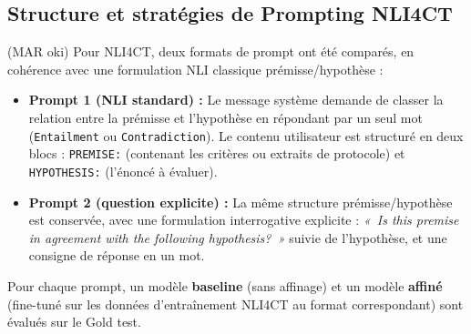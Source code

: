 \subsection{Structure et stratégies de Prompting NLI4CT} (MAR oki)
Pour NLI4CT, deux formats de prompt ont été comparés, en cohérence avec une formulation NLI classique prémisse/hypothèse :
\begin{itemize}
    \item \textbf{Prompt 1 (NLI standard) :} Le message système demande de classer la relation entre la prémisse et l'hypothèse en répondant par un seul mot (\texttt{Entailment} ou \texttt{Contradiction}). Le contenu utilisateur est structuré en deux blocs : \texttt{PREMISE:} (contenant les critères ou extraits de protocole) et \texttt{HYPOTHESIS:} (l'énoncé à évaluer).
    \item \textbf{Prompt 2 (question explicite) :} La même structure prémisse/hypothèse est conservée, avec une formulation interrogative explicite : \textit{«~Is this premise in agreement with the following hypothesis?~»} suivie de l'hypothèse, et une consigne de réponse en un mot.
\end{itemize}
Pour chaque prompt, un modèle \textbf{baseline} (sans affinage) et un modèle \textbf{affiné} (fine-tuné sur les données d'entraînement NLI4CT au format correspondant) sont évalués sur le Gold test.

